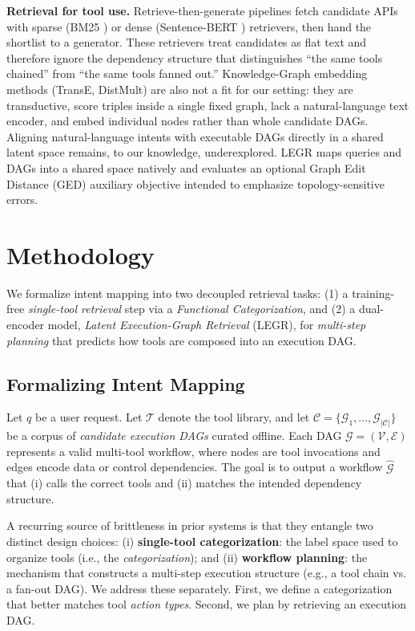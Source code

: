 \documentclass{article}
\begin{document}
\textbf{Retrieval for tool use.} Retrieve-then-generate pipelines fetch candidate APIs with sparse (BM25 \cite{robertson2009probabilistic}) or dense (Sentence-BERT \cite{reimers-gurevych-2019-sentence}) retrievers, then hand the shortlist to a generator. These retrievers treat candidates as flat text and therefore ignore the dependency structure that distinguishes ``the same tools chained'' from ``the same tools fanned out.'' Knowledge-Graph embedding methods (TransE, DistMult) are also not a fit for our setting: they are transductive, score triples inside a single fixed graph, lack a natural-language text encoder, and embed individual nodes rather than whole candidate DAGs. Aligning natural-language intents with executable DAGs directly in a shared latent space remains, to our knowledge, underexplored. LEGR maps queries and DAGs into a shared space natively and evaluates an optional Graph Edit Distance (GED) auxiliary objective \cite{sanfeliu1983distance} intended to emphasize topology-sensitive errors.

\section{Methodology}

We formalize intent mapping into two decoupled retrieval tasks: (1) a training-free \emph{single-tool retrieval} step via a \emph{Functional Categorization}, and (2) a dual-encoder model, \textit{Latent Execution-Graph Retrieval} (LEGR), for \emph{multi-step planning} that predicts how tools are composed into an execution DAG.

\subsection{Formalizing Intent Mapping}
\label{sec:overview}
Let $q$ be a user request. Let $\mathcal{T}$ denote the tool library, and let $\mathcal{C} = \{\mathcal{G}_1,\dots,\mathcal{G}_{|\mathcal{C}|}\}$ be a corpus of \emph{candidate execution DAGs} curated offline. Each DAG $\mathcal{G}=(\mathcal{V},\mathcal{E})$ represents a valid multi-tool workflow, where nodes are tool invocations and edges encode data or control dependencies. The goal is to output a workflow $\hat{\mathcal{G}}$ that (i) calls the correct tools and (ii) matches the intended dependency structure.

A recurring source of brittleness in prior systems is that they entangle two distinct design choices:
(i) \textbf{single-tool categorization}: the label space used to organize tools (i.e., the \emph{categorization}); and
(ii) \textbf{workflow planning}: the mechanism that constructs a multi-step execution structure (e.g., a tool chain vs. a fan-out DAG).
We address these separately. First, we define a categorization that better matches tool \emph{action types}. Second, we plan by retrieving an execution DAG.
\end{document}

